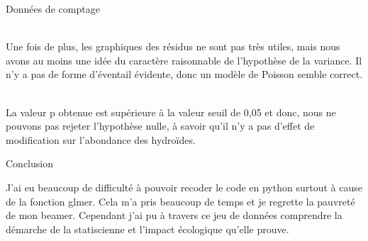 \documentclass[unknownkeysallowed]{beamer}
\begin{document}
\begin{frame}{Données de comptage}

 \\

Une fois de plus, les graphiques des résidus ne sont pas très utiles, mais nous avons au moins une idée du caractère raisonnable de l’hypothèse de la variance. Il n'y a pas de forme d'éventail évidente, donc un modèle de Poisson semble correct.

 \\
 
 La valeur p obtenue est supérieure à la valeur seuil de 0,05 et donc, nous ne pouvons pas rejeter l'hypothèse nulle, à savoir qu'il n'y a pas d'effet de modification sur l'abondance des hydroïdes.
 
 
\end{frame}


\begin{frame}{Conclusion}

J'ai eu beaucoup de difficulté à pouvoir recoder le code en python surtout à cause de la fonction glmer. Cela m'a pris beaucoup de temps et je regrette la pauvreté de mon beamer.
Cependant j'ai pu à travers ce jeu de données comprendre la démarche de la statiscienne et l'impact écologique qu'elle prouve.
    
\end{frame}
\end{document}
